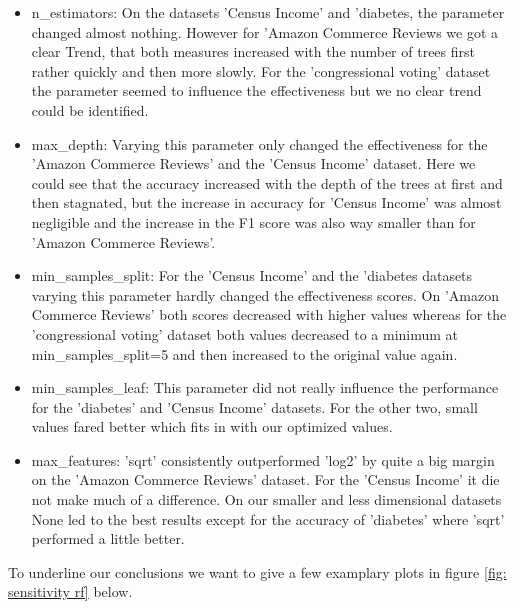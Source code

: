 \documentclass[a4paper,10pt]{article}
\begin{document}
\begin{itemize}
    \item \textsf{n\_estimators}: On the datasets 'Census Income' and 'diabetes, the parameter changed almost nothing. However for 'Amazon Commerce Reviews we got a clear Trend, that both measures increased with the number of trees first rather quickly and then more slowly. For the 'congressional voting' dataset the parameter seemed to influence the effectiveness but we no clear trend could be identified. 
\item \textsf{max\_depth}: Varying this parameter only changed the effectiveness for the 'Amazon Commerce Reviews'  and the 'Census Income' dataset. Here we could see that the accuracy increased with the depth of the trees at first and then stagnated, but the increase in accuracy for 'Census Income' was almost negligible and the increase in the F1 score was also way smaller than for 'Amazon Commerce Reviews'.

\item \textsf{min\_samples\_split}: For the 'Census Income' and the 'diabetes datasets varying this parameter hardly changed the effectiveness scores. On 'Amazon Commerce Reviews' both scores decreased with higher values whereas for the 'congressional voting' dataset both values decreased to a minimum at \textsf{min\_samples\_split}=5 and then increased to the original value again.
\item \textsf{min\_samples\_leaf}: This parameter did not really influence the performance for the 'diabetes' and 'Census Income' datasets. For the other two, small values fared better which fits in with our optimized values.
\item \textsf{max\_features}: 'sqrt' consistently outperformed 'log2' by quite a big margin on the 'Amazon Commerce Reviews' dataset. For the 'Census Income' it die not make much of a difference. On our smaller and less dimensional datasets None led to the best results except for the accuracy of 'diabetes' where 'sqrt' performed a little better.
\end{itemize}

To underline our conclusions we want to give a few examplary plots in figure \ref{fig: sensitivity rf} below. 
\end{document}
